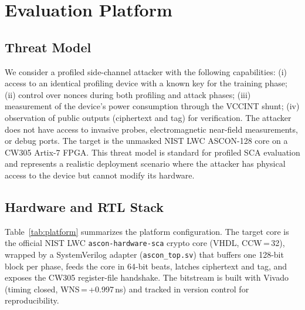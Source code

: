 \documentclass[conference]{IEEEtran}
\begin{document}
\section{Evaluation Platform}
\label{sec:platform}

\subsection{Threat Model}

We consider a profiled side-channel attacker with the following
capabilities: (i) access to an identical profiling device with
a known key for the training phase; (ii) control over nonces
during both profiling and attack phases; (iii) measurement of
the device's power consumption through the VCCINT shunt; (iv)
observation of public outputs (ciphertext and tag) for
verification. The attacker does not have access to invasive
probes, electromagnetic near-field measurements, or debug
ports. The target is the unmasked NIST LWC ASCON-128 core on
a CW305 Artix-7 FPGA. This threat model is standard for
profiled SCA evaluation and represents a realistic deployment
scenario where the attacker has physical access to the device
but cannot modify its hardware.

\subsection{Hardware and RTL Stack}

Table~\ref{tab:platform} summarizes the platform configuration.
The target core is the official NIST LWC
\texttt{ascon-hardware-sca} crypto core (VHDL, CCW\,=\,32),
wrapped by a SystemVerilog adapter (\texttt{ascon\_top.sv}) that
buffers one 128-bit block per phase, feeds the core in 64-bit
beats, latches ciphertext and tag, and exposes the CW305
register-file handshake. The bitstream is built with Vivado
(timing closed, WNS\,=\,+0.997\,ns) and tracked in version
control for reproducibility.
\end{document}
